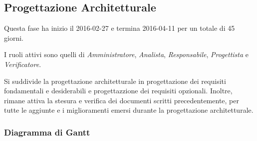 \newpage

\subsection{Progettazione Architetturale}
Questa fase ha inizio il 2016-02-27 e termina 2016-04-11 per un totale di 45 giorni.

I ruoli attivi sono quelli di \textit{Amministratore}, \textit{Analista}, \textit{Responsabile}, \textit{Progettista} e \textit{Verificatore}.

Si suddivide la progettazione architetturale in progettazione dei requisiti fondamentali e desiderabili e progettazzione dei requisiti opzionali. Inoltre, rimane attiva la stesura e verifica dei documenti scritti precedentemente, per tutte le aggiunte e i miglioramenti emersi durante la progettazione architetturale.

\subsubsection{Diagramma di Gantt}

